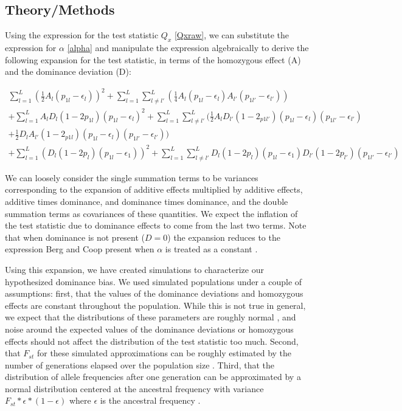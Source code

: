 \documentclass[a4paper,12pt]{article}
\begin{document}
\subsection*{Theory/Methods}



Using the expression for the test statistic $Q_x$ \eqref{Qxraw}, we
can substitute the expression for $\alpha$ \eqref{alpha} and manipulate
the expression algebraically to derive the following expansion for the
test statistic, in terms of the homozygous effect (A) and the dominance
deviation (D):

\begin{equation}
  \begin{split}
  \sum^L_{l=1}( \frac{1}{2}A_l(p_{1l}-\epsilon_l))^2+\sum^L_{l=1}\sum^L_{
    l \neq l'}(\frac{1}{4}A_l(p_{1l}-\epsilon_{l})A_{l'}(p_{1l'}-\epsilon_{l'}))
  \\
  +\sum^L_{l=1}A_lD_l(1-2p_{1l})(p_{1l}-\epsilon_l)^2 +
  \sum^L_{l=1}\sum^L_{l \neq
    l'}(\frac{1}{2}A_lD_{l'}(1-2_{p1l'})(p_{1l}-\epsilon_l)(p_{1l'}-\epsilon_{l'}) \\
  + \frac{1}{2}D_lA_{l'}(1-2_{p1l})(p_{1l}-\epsilon_l)(p_{1l'}-\epsilon_{l'})) \\
   + \sum^L_{l=1} (D_l(1-2p_l)(p_{1l}-\epsilon_{1}))^2
   + \sum^L_{l=1}\sum^L_{l \neq
     l'}D_{l}(1-2p_{l})(p_{1l}-\epsilon_{1})D_{l'}(1-2p_{l'})(p_{1l'}-\epsilon_{l'}) \label{expansion}
  \end{split}
\end{equation}

We can loosely consider the single summation terms to be variances
corresponding to the expansion of additive effects multiplied by
additive effects, additive times dominance, and dominance times
dominance, and the double summation terms as covariances of these
quantities. We expect the inflation of the test statistic due to
dominance effects to come from the last two terms. Note that when
dominance is not present ($D=0$) the expansion reduces to the
expression Berg and Coop present when $\alpha$ is treated as a constant
\cite{berg}.

Using this expansion, we have created simulations to characterize our
hypothesized dominance bias. We used simulated populations
under a couple of assumptions: first, that the values of the dominance
deviations and homozygous effects are constant throughout the
population. While this is not true in general, we expect that the
distributions of these parameters are roughly normal
\cite{normaldist}, and noise around the expected values of the
dominance deviations or homozygous effects should not affect the distribution of the test statistic too
much. Second, that $F_{st}$ for these simulated approximations
can be roughly estimated by the number of generations elapsed over the
population size \cite{Fstest}. Third, that the distribution of allele frequencies after
one generation can be approximated by a normal distribution centered
at the ancestral frequency with variance
$F_{st}*\epsilon*(1-\epsilon)$ where $\epsilon$ is the ancestral
frequency \cite{gillespie}.
\end{document}

